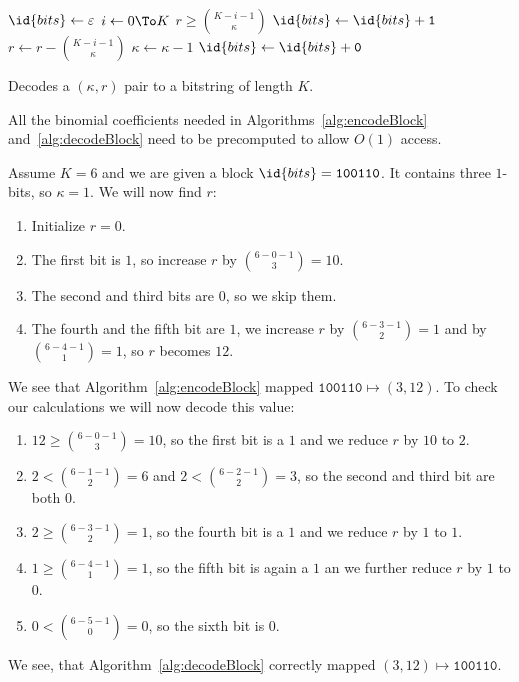 \begin{itemize}
  \begin{algorithm}[htb]
    \begin{codebox}
      \li $\id{bits} \gets \varepsilon$
      \li \For $i \gets 0 \To K$
          \Do
      \li   \If $r \geq \binom{K - i - 1}{\kappa}$
            \Then
      \li     $\id{bits} \gets \id{bits} + \texttt{1}$
      \li     $r \gets r - \binom{K - i - 1}{\kappa}$
      \li     $\kappa \gets \kappa - 1$
            \Else
      \li     $\id{bits} \gets \id{bits} + \texttt{0}$
            \End
          \End
      \li \Return {}
    \end{codebox}
    \caption{Decodes a $(\kappa, r)$ pair to a bitstring of length $K$.}
    \label{alg:decodeBlock}
  \end{algorithm}
\end{itemize}

All the binomial coefficients needed in Algorithms~\ref{alg:encodeBlock} and~\ref{alg:decodeBlock} need to be precomputed to allow $O(1)$ access.

\begin{Example}
  Assume $K = 6$ and we are given a block $\id{bits} = \texttt{100110}$. It contains three $1$-bits, so $\kappa = 1$. We will now find $r$:
  \begin{enumerate}
    \item Initialize $r = 0$.
    \item The first bit is $1$, so increase $r$ by $\binom{6 - 0 - 1}{3} = 10$.
    \item The second and third bits are $0$, so we skip them.
    \item The fourth and the fifth bit are $1$, we increase $r$ by $\binom{6 - 3 - 1}{2} = 1$ and by $\binom{6 - 4 - 1}{1} = 1$, so $r$ becomes $12$. 
  \end{enumerate}
  We see that Algorithm~\ref{alg:encodeBlock} mapped $\texttt{100110} \mapsto (3,12)$. To check our calculations we will now decode this value:
  \begin{enumerate}
    \item $12 \geq \binom{6 - 0 - 1}{3} = 10$, so the first bit is a $1$ and we reduce $r$ by $10$ to $2$.
    \item $2 < \binom{6 - 1 - 1}{2} = 6$ and $2 < \binom{6 - 2 - 1}{2} = 3$, so the second and third bit are both $0$.
    \item $2 \geq \binom{6 - 3 - 1}{2} = 1$, so the fourth bit is a $1$ and we reduce $r$ by $1$ to $1$.
    \item $1 \geq \binom{6 - 4 - 1}{1} = 1$, so the fifth bit is again a $1$ an we further reduce $r$ by $1$ to $0$.
    \item $0 < \binom{6 - 5 - 1}{0} = 0$, so the sixth bit is $0$.
  \end{enumerate}
  We see, that Algorithm~\ref{alg:decodeBlock} correctly mapped $(3,12) \mapsto \texttt{100110}$.
\end{Example}
